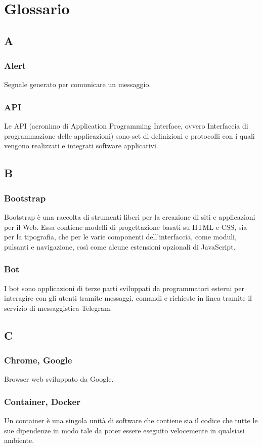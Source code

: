 \appendix
{}

\section{Glossario}
\subsection{A}
\subsubsection{Alert} Segnale generato per comunicare un messaggio.
\subsubsection{API} Le API (acronimo di Application Programming Interface, ovvero Interfaccia di programmazione delle applicazioni) sono set di definizioni e protocolli con i quali vengono realizzati e integrati software applicativi.
\subsection{B}
\subsubsection{Bootstrap}  Bootstrap è una raccolta di strumenti liberi per la creazione di siti e applicazioni per il Web. Essa contiene modelli di progettazione basati su HTML e CSS, sia per la tipografia, che per le varie componenti dell'interfaccia, come moduli, pulsanti e navigazione, così come alcune estensioni opzionali di JavaScript.
\subsubsection{Bot}  I bot sono applicazioni di terze parti sviluppati da programmatori esterni per interagire con gli utenti tramite messaggi, comandi e richieste in linea tramite il servizio di messaggistica Telegram.
\subsection{C}
\subsubsection*{Chrome, Google}
Browser web sviluppato da Google.
\subsubsection*{Container, Docker}
Un container è una singola unità di software che contiene sia il codice che tutte le sue dipendenze in modo tale da poter essere eseguito velocemente in qualsiasi ambiente.
